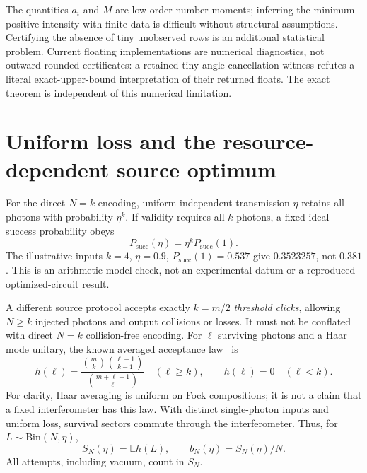 \documentclass[11pt,a4paper]{article}
\theoremstyle{remark}\newtheorem{remark}[theorem]{Remark}
\newcommand{\E}{\mathbb E}
\newcommand{\succp}{P_{\mathrm{succ}}}
\begin{document}
The quantities $a_i$ and $M$ are low-order number moments; inferring the minimum positive intensity with finite data is difficult without structural assumptions. Certifying the absence of tiny unobserved rows is an additional statistical problem. Current floating implementations are numerical diagnostics, not outward-rounded certificates: a retained tiny-angle cancellation witness refutes a literal exact-upper-bound interpretation of their returned floats. The exact theorem is independent of this numerical limitation.

\section{Uniform loss and the resource-dependent source optimum}\label{sec:loss}
For the direct $N=k$ encoding, uniform independent transmission $\eta$ retains all photons with probability $\eta^k$. If validity requires all $k$ photons, a fixed ideal success probability obeys
\begin{equation}
 \succp(\eta)=\eta^k\succp(1).\label{eq:all_detected}
\end{equation}
The illustrative inputs $k=4$, $\eta=0.9$, $\succp(1)=0.537$ give $0.3523257$, not $0.381$. This is an arithmetic model check, not an experimental datum or a reproduced optimized-circuit result.

A different source protocol accepts exactly $k=m/2$ \emph{threshold clicks}, allowing $N\ge k$ injected photons and output collisions or losses. It must not be conflated with direct $N=k$ collision-free encoding. For $\ell$ surviving photons and a Haar mode unitary, the known averaged acceptance law~\cite[Lemma 1, Eq.~(6), v2]{bouland2023} is
\begin{equation}
 h(\ell)=\frac{\binom{m}{k}\binom{\ell-1}{k-1}}{\binom{m+\ell-1}{\ell}}\quad(\ell\ge k),\qquad h(\ell)=0\quad(\ell<k).\label{eq:haar_click}
\end{equation}
For clarity, Haar averaging is uniform on Fock compositions; it is not a claim that a fixed interferometer has this law. With distinct single-photon inputs and uniform loss, survival sectors commute through the interferometer. Thus, for $L\sim\mathrm{Bin}(N,\eta)$,
\begin{equation}
 S_N(\eta)=\E h(L),\qquad b_N(\eta)=S_N(\eta)/N.\label{eq:source}
\end{equation}
All attempts, including vacuum, count in $S_N$.
\end{document}
